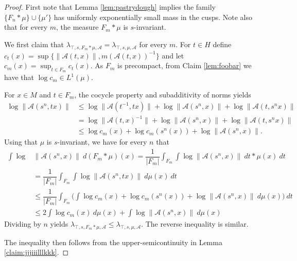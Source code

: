 \documentclass[10pt,reqno]{amsart}
\theoremstyle{Theorem}
\theoremstyle{definition}
\theoremstyle{remark}
\renewcommand{\epsilon}{\varepsilon}
\newcommand{\Z}{\mathbb {Z}}
\newcommand{\inv}{^{-1}}
\def\calA{\mathcal A}
\def\vecm{\mathbf{m}}
\def\blue{}
\begin{document}
\begin{proof}
{\blue First note that  Lemma \ref{lem:pastrydough} implies the family $\{F_n \ast \mu\}\cup \{\mu'\}$  has uniformly exponentially small mass in the cusps.}    Note also that for every $m$, the measure $F_m \ast \mu$ is $s$-invariant.

We first claim that  $\lambda_{\top, s, F_m \ast \mu, \calA} =  \lambda_{\top, s, \mu, \calA}$ for every $m$.
For   $t \in H$ define $c_t (x)=   \sup\{\|\calA(t , x)\| , m(\calA(t, x))\inv \} $ and let $c_m(x) = \sup _{t\in F_m } c_t(x)$.
As $F_m$ is precompact, from  Claim \ref{lem:foobar} we have  that $\log c_m \in L^1(\mu)$.  %

 For  $x \in M$ and   $t \in F_m$, the cocycle property and subadditivity of norms yields
\begin{align*}
\log \|\calA(s^n, tx)\| &\leq  \log \|\calA(t\inv, tx)\| + \log \|\calA(s^n, x)\| + \log \|\calA(t , s^nx)\|  \\
&=  \log \|\calA(t, x)\inv\| + \log \|\calA(s^n, x)\| + \log \|\calA(t , s^nx)\|  \\  %
&\leq \log c_m(x) + \log c_m (s^n(x)) + \log \|\calA(s^n, x)\|. %
\end{align*}
Using that $\mu$ is $s$-invariant, we have for every $n$ that
\begin{align*}
\int \log &\|\calA(s^n, x) \| \ d (F_m\ast \mu )(x) = \dfrac 1 {|F_m|}\int_{F_m} \int \log \|\calA(s^n, x)\| \ dt*\mu (x) \ d t \\
&= \dfrac 1 {|F_{m}|}\int_{F_{m}} \int \log \|\calA(s^n, tx)\| \ d\mu (x) \ d t \\
&\leq \dfrac 1 {|F_{m}|}\int_{F_{m}}  \bigg(\int  \log c_m(x) + \log c_m (s^n(x)) +  \log \|\calA(s^n, x)\|  \ d \mu (x) \bigg) \ d t \\
&\leq 2\int  \log  c_m(x)   \ d \mu(x) + \int \log \|\calA(s^n, x)\| \ d \mu{(x)}
\end{align*}
Dividing by $n$ yields $\lambda_{\top, s, F_m \ast \mu,\calA}\le \lambda_{\top, s, \mu, \calA}$.   The reverse  inequality is similar.


The inequality then follows from the  upper-semicontinuity  in Lemma \ref{claim:jjjiiilllkkk}.
\end{proof}
\end{document}
